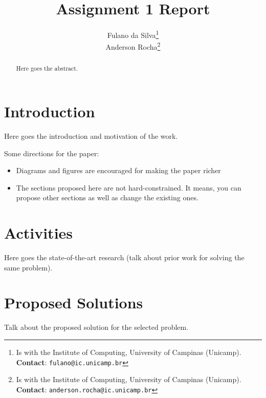 \documentclass[10pt,twocolumn,letterpaper]{article}
\begin{document}
\title{Assignment 1 Report}
\author{Fulano da Silva\thanks{Is with the Institute of Computing, University of Campinas (Unicamp). \textbf{Contact}: \tt\small{fulano@ic.unicamp.br}}\\
Anderson Rocha\thanks{Is with the Institute of Computing, University of Campinas (Unicamp). \textbf{Contact}: \tt\small{anderson.rocha@ic.unicamp.br}}
}

\maketitle
\begin{abstract}
Here goes the abstract. 
\end{abstract}

\section{Introduction}
Here goes the introduction and motivation of the work.

Some directions for the paper:

\begin{itemize}
	\item Diagrams and figures are encouraged for making the paper richer
	\item The sections proposed here are not hard-constrained. It means, you 
	can propose other sections as well as change the existing ones. 
\end{itemize}

\section{Activities}
Here goes the state-of-the-art research (talk about prior work for solving the same problem). 

\section{Proposed Solutions}
Talk about the proposed solution for the selected problem. 

\end{document}
